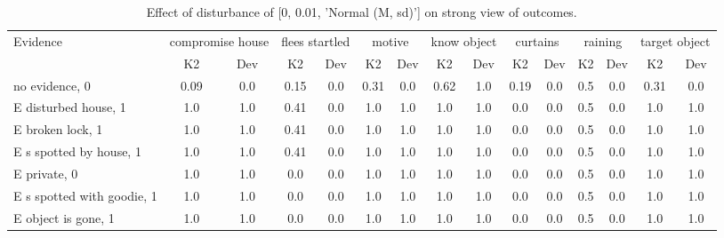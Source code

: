 \begin{table}\begin{tabular}{l|cc|cc|cc|cc|cc|cc|cc}\toprule\multirow{2}{*}{Evidence} & \multicolumn{2}{c}{compromise house}& \multicolumn{2}{c}{flees startled}& \multicolumn{2}{c}{motive}& \multicolumn{2}{c}{know object}& \multicolumn{2}{c}{curtains}& \multicolumn{2}{c}{raining}& \multicolumn{2}{c}{target object}\\& {K2} & {Dev}& {K2} & {Dev}& {K2} & {Dev}& {K2} & {Dev}& {K2} & {Dev}& {K2} & {Dev}& {K2} & {Dev}\\\midrule
no evidence, 0 & \cellcolor{Bittersweet}0.09&\cellcolor{Bittersweet}0.0&\cellcolor{Bittersweet}0.15&\cellcolor{Bittersweet}0.0&\cellcolor{Bittersweet}0.31&\cellcolor{Bittersweet}0.0&\cellcolor{Bittersweet}0.62&\cellcolor{Bittersweet}1.0&\cellcolor{Bittersweet}0.19&\cellcolor{Bittersweet}0.0&0.5&0.0&\cellcolor{Bittersweet}0.31&\cellcolor{Bittersweet}0.0\\E disturbed house, 1 & \cellcolor{Bittersweet}1.0&\cellcolor{Bittersweet}1.0&0.41&0.0&\cellcolor{Bittersweet}1.0&\cellcolor{Bittersweet}1.0&\cellcolor{Bittersweet}1.0&\cellcolor{Bittersweet}1.0&\cellcolor{Bittersweet}0.0&\cellcolor{Bittersweet}0.0&0.5&0.0&\cellcolor{Bittersweet}1.0&\cellcolor{Bittersweet}1.0\\E broken lock, 1 & \cellcolor{Bittersweet}1.0&\cellcolor{Bittersweet}1.0&0.41&0.0&\cellcolor{Bittersweet}1.0&\cellcolor{Bittersweet}1.0&\cellcolor{Bittersweet}1.0&\cellcolor{Bittersweet}1.0&\cellcolor{Bittersweet}0.0&\cellcolor{Bittersweet}0.0&0.5&0.0&\cellcolor{Bittersweet}1.0&\cellcolor{Bittersweet}1.0\\E s spotted by house, 1 & \cellcolor{Bittersweet}1.0&\cellcolor{Bittersweet}1.0&0.41&0.0&\cellcolor{Bittersweet}1.0&\cellcolor{Bittersweet}1.0&\cellcolor{Bittersweet}1.0&\cellcolor{Bittersweet}1.0&\cellcolor{Bittersweet}0.0&\cellcolor{Bittersweet}0.0&0.5&0.0&\cellcolor{Bittersweet}1.0&\cellcolor{Bittersweet}1.0\\E private, 0 & \cellcolor{Bittersweet}1.0&\cellcolor{Bittersweet}1.0&\cellcolor{Bittersweet}0.0&\cellcolor{Bittersweet}0.0&\cellcolor{Bittersweet}1.0&\cellcolor{Bittersweet}1.0&\cellcolor{Bittersweet}1.0&\cellcolor{Bittersweet}1.0&\cellcolor{Bittersweet}0.0&\cellcolor{Bittersweet}0.0&0.5&0.0&\cellcolor{Bittersweet}1.0&\cellcolor{Bittersweet}1.0\\E s spotted with goodie, 1 & \cellcolor{Bittersweet}1.0&\cellcolor{Bittersweet}1.0&\cellcolor{Bittersweet}0.0&\cellcolor{Bittersweet}0.0&\cellcolor{Bittersweet}1.0&\cellcolor{Bittersweet}1.0&\cellcolor{Bittersweet}1.0&\cellcolor{Bittersweet}1.0&\cellcolor{Bittersweet}0.0&\cellcolor{Bittersweet}0.0&0.5&0.0&\cellcolor{Bittersweet}1.0&\cellcolor{Bittersweet}1.0\\E object is gone, 1 & \cellcolor{Bittersweet}1.0&\cellcolor{Bittersweet}1.0&\cellcolor{Bittersweet}0.0&\cellcolor{Bittersweet}0.0&\cellcolor{Bittersweet}1.0&\cellcolor{Bittersweet}1.0&\cellcolor{Bittersweet}1.0&\cellcolor{Bittersweet}1.0&\cellcolor{Bittersweet}0.0&\cellcolor{Bittersweet}0.0&0.5&0.0&\cellcolor{Bittersweet}1.0&\cellcolor{Bittersweet}1.0\\\bottomrule\end{tabular}\caption{Effect of disturbance of [0, 0.01, 'Normal (M, sd)'] on strong view of outcomes.}\end{table}
